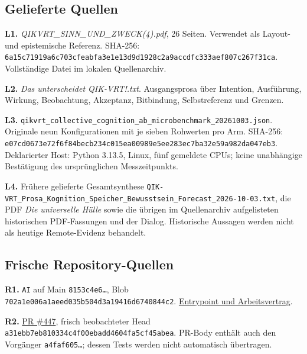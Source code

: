 \begin{cols}
\subsection*{Gelieferte Quellen}
\textbf{L1.} \emph{QIKVRT\_SINN\_UND\_ZWECK(4).pdf}, 26 Seiten. Verwendet als Layout- und epistemische Referenz. SHA-256: \nolinkurl{6a15c71919a6c703cfeabfa3e1e13d9d1928c2a9accdfc333aef807c267f31ca}. Vollständige Datei im lokalen Quellenarchiv.

\textbf{L2.} \emph{Das unterscheidet QIK-VRT!.txt}. Ausgangsprosa über Intention, Ausführung, Wirkung, Beobachtung, Akzeptanz, Bitbindung, Selbstreferenz und Grenzen.

\textbf{L3.} \nolinkurl{qikvrt_collective_cognition_ab_microbenchmark_20261003.json}. Originale neun Konfigurationen mit je sieben Rohwerten pro Arm. SHA-256: \nolinkurl{e07cd0673e72f6f84becb234c015ea00989e5ee283ec7ba32e59a982da047eb3}. Deklarierter Host: Python 3.13.5, Linux, fünf gemeldete CPUs; keine unabhängige Bestätigung des ursprünglichen Messzeitpunkts.

\textbf{L4.} Frühere gelieferte Gesamtsynthese \nolinkurl{QIK-VRT_Prosa_Kognition_Speicher_Bewusstsein_Forecast_2026-10-03.txt}, die PDF \emph{Die universelle Hülle} sowie die übrigen im Quellenarchiv aufgelisteten historischen PDF-Fassungen und der Dialog. Historische Aussagen werden nicht als heutige Remote-Evidenz behandelt.

\subsection*{Frische Repository-Quellen}
\textbf{R1.} \texttt{AI} auf Main \texttt{8153c4e6…}, Blob \nolinkurl{702a1e006a1aeed035b504d3a19416d6740844c2}. \href{https://github.com/ingolf-lohmann/qik-vrt/blob/8153c4e69a6245aadf67f0741fb50d9707c19e34/AI}{Entrypoint und Arbeitsvertrag}.

\textbf{R2.} \href{https://github.com/ingolf-lohmann/qik-vrt/pull/447}{PR \#447}, frisch beobachteter Head \nolinkurl{a31ebb7eb810334c4f00ebadd4604fa5cf45abea}. PR-Body enthält auch den Vorgänger \texttt{a4faf605…}; dessen Tests werden nicht automatisch übertragen.


\end{cols}

